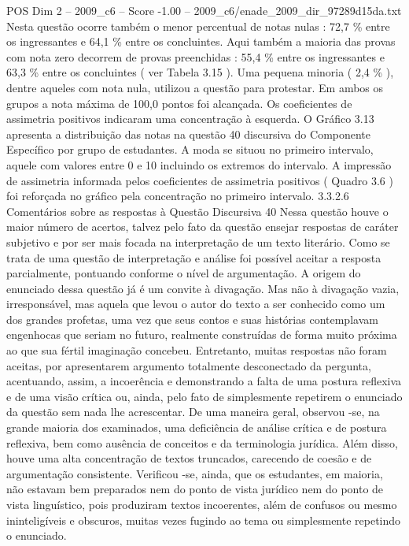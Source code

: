 \begin{textsample}{POS Dim 2 – 2009\_c6 – Score -1.00 – 2009\_c6/enade\_2009\_dir\_97289d15da.txt}
Nesta questão ocorre também o menor percentual de notas nulas : 72,7 \% entre os ingressantes e 64,1 \% entre os concluintes.
Aqui também a maioria das provas com nota zero decorrem de provas preenchidas : 55,4 \% entre os ingressantes e 63,3 \% entre os concluintes ( ver Tabela 3.15 ).
Uma pequena minoria ( 2,4 \% ), dentre aqueles com nota nula, utilizou a questão para protestar.
Em ambos os grupos a nota máxima de 100,0 pontos foi alcançada.
Os coeficientes de assimetria positivos indicaram uma concentração à esquerda.
O Gráfico 3.13 apresenta a distribuição das notas na questão 40 discursiva do Componente Específico por grupo de estudantes.
A moda se situou no primeiro intervalo, aquele com valores entre 0 e 10 incluindo os extremos do intervalo.
A impressão de assimetria informada pelos coeficientes de assimetria positivos ( Quadro 3.6 ) foi reforçada no gráfico pela concentração no primeiro intervalo. 3.3.2.6 Comentários sobre as respostas à Questão Discursiva 40 Nessa questão houve o maior número de acertos, talvez pelo fato da questão ensejar respostas de caráter subjetivo e por ser mais focada na interpretação de um texto literário.
Como se trata de uma questão de interpretação e análise foi possível aceitar a resposta parcialmente, pontuando conforme o nível de argumentação.
A origem do enunciado dessa questão já é um convite à divagação.
Mas não à divagação vazia, irresponsável, mas aquela que levou o autor do texto a ser conhecido como um dos grandes profetas, uma vez que seus contos e suas histórias contemplavam engenhocas que seriam no futuro, realmente construídas de forma muito próxima ao que sua fértil imaginação concebeu.
Entretanto, muitas respostas não foram aceitas, por apresentarem argumento totalmente desconectado da pergunta, acentuando, assim, a incoerência e demonstrando a falta de uma postura reflexiva e de uma visão crítica ou, ainda, pelo fato de simplesmente repetirem o enunciado da questão sem nada lhe acrescentar.
De uma maneira geral, observou -se, na grande maioria dos examinados, uma deficiência de análise crítica e de postura reflexiva, bem como ausência de conceitos e da terminologia jurídica.
Além disso, houve uma alta concentração de textos truncados, carecendo de coesão e de argumentação consistente.
Verificou -se, ainda, que os estudantes, em maioria, não estavam bem preparados nem do ponto de vista jurídico nem do ponto de vista linguístico, pois produziram textos incoerentes, além de confusos ou mesmo ininteligíveis e obscuros, muitas vezes fugindo ao tema ou simplesmente repetindo o enunciado.

\end{textsample}
